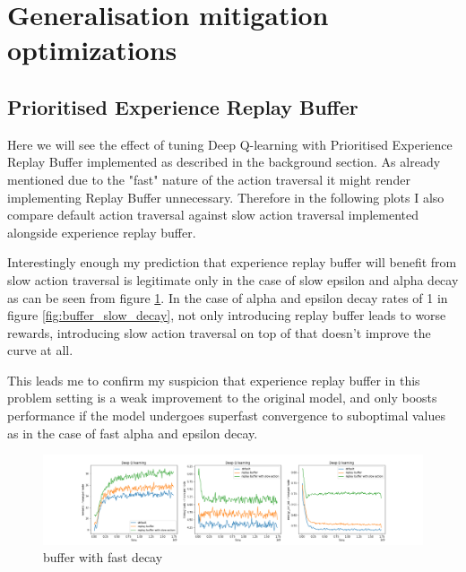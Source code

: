 \section{Generalisation mitigation optimizations}
\subsection{Prioritised Experience Replay Buffer}

Here we will see the effect of tuning Deep Q-learning with 
Prioritised Experience Replay Buffer implemented as described
in the background section. As already mentioned due to 
the "fast" nature of the action traversal it might render 
implementing Replay Buffer unnecessary. Therefore in the 
following plots I also compare default action traversal against
slow action traversal implemented alongside experience replay 
buffer. 

Interestingly enough my prediction that experience replay buffer
will benefit from slow action traversal is legitimate
only in the case of slow epsilon and alpha decay as can be seen
from figure \ref{fig:buffer_fast_decay}. In the case of alpha
and epsilon decay rates of 1 in figure \ref{fig:buffer_slow_decay}, not only introducing replay buffer
leads to worse rewards, introducing slow action traversal on top of that doesn't improve the curve at all. 

This leads me to confirm my suspicion that experience replay
buffer in this problem setting is a weak improvement to the 
original model, and only boosts performance if the model 
undergoes superfast convergence to suboptimal values as in the
case of fast alpha and epsilon decay.

\begin{figure}[H]
\centering
\hspace*{-3.3cm}  
\includegraphics[scale=0.40]{plots/replay_buffer/replay_buffer_with_slow_action_traversal_fast_decay_deep_q_SMALL.png}
  \caption{buffer with fast decay}
  \label{fig:buffer_fast_decay}
\end{figure}


